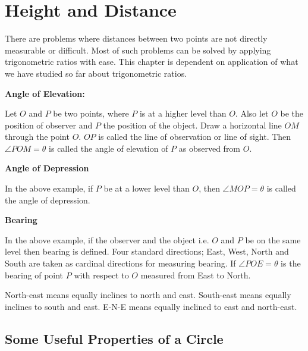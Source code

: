 \chapter{Height and Distance}
There are problems where distances between two points are not directly measurable or difficult. Most of such problems can be solved
by applying trigonometric ratios with ease. This chapter is dependent on application of what we have studied so far about
trigonometric ratios.

\startitemize[n]
\item {\bf Angle of Elevation:}

  \startplacefigure
    \externalfigure[27_1.pdf]
  \stopplacefigure

  Let $O$ and $P$ be two points, where $P$ is at a higher level than $O$. Also let $O$ be the
  position of observer and $P$ the position of the object. Draw a horizontal line  $OM$ through the point
  $O$. $OP$ is called the line of observation or line of sight. Then $\angle POM = \theta$ is called the angle
  of elevation of $P$ as observed from $O$.
\item {\bf Angle of Depression}

  \startplacefigure
    \externalfigure[27_2.pdf]
  \stopplacefigure

  In the above example, if $P$ be at a lower level than $O$, then $\angle MOP = \theta$ is called the angle of
  depression.

\item  {\bf Bearing}

  In the above example, if the observer and the object i.e. $O$ and $P$ be on the same level then bearing is
  defined. Four standard directions; East, West, North and South are taken as cardinal directions for measuring bearing. If
  $\angle POE = \theta$ is the bearing of point $P$ with respect to $O$ measured from East to North.

  \startplacefigure
    \externalfigure[27_3.pdf]
  \stopplacefigure

  North-east means equally inclines to north and east. South-east means equally inclines to south and east. E-N-E means
  equally inclined to east and north-east.
\stopitemize

\section{Some Useful Properties of a Circle}
\startplacefigure
  \externalfigure[27_4.pdf]
\stopplacefigure

